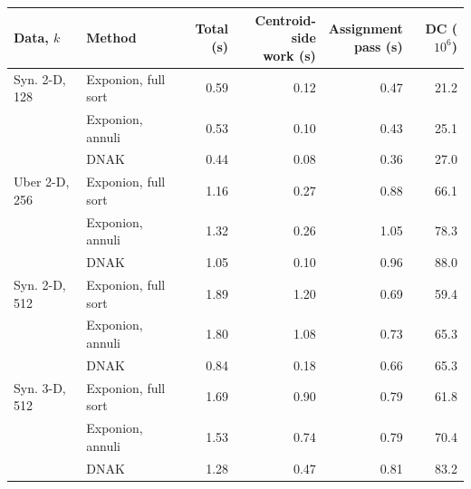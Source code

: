 \begin{tabular}{llrrrr}
\toprule
Data, $k$ & Method & Total (s) & \shortstack[r]{Centroid-side\\ work (s)} & \shortstack[r]{Assignment\\ pass (s)} & DC ($10^6$) \\
\midrule
Syn. 2-D, 128 & Exponion, full sort & 0.59 & 0.12 & 0.47 & 21.2 \\
 & Exponion, annuli & 0.53 & 0.10 & 0.43 & 25.1 \\
 & DNAK & 0.44 & 0.08 & 0.36 & 27.0 \\
\midrule
Uber 2-D, 256 & Exponion, full sort & 1.16 & 0.27 & 0.88 & 66.1 \\
 & Exponion, annuli & 1.32 & 0.26 & 1.05 & 78.3 \\
 & DNAK & 1.05 & 0.10 & 0.96 & 88.0 \\
\midrule
Syn. 2-D, 512 & Exponion, full sort & 1.89 & 1.20 & 0.69 & 59.4 \\
 & Exponion, annuli & 1.80 & 1.08 & 0.73 & 65.3 \\
 & DNAK & 0.84 & 0.18 & 0.66 & 65.3 \\
\midrule
Syn. 3-D, 512 & Exponion, full sort & 1.69 & 0.90 & 0.79 & 61.8 \\
 & Exponion, annuli & 1.53 & 0.74 & 0.79 & 70.4 \\
 & DNAK & 1.28 & 0.47 & 0.81 & 83.2 \\
\bottomrule
\end{tabular}
